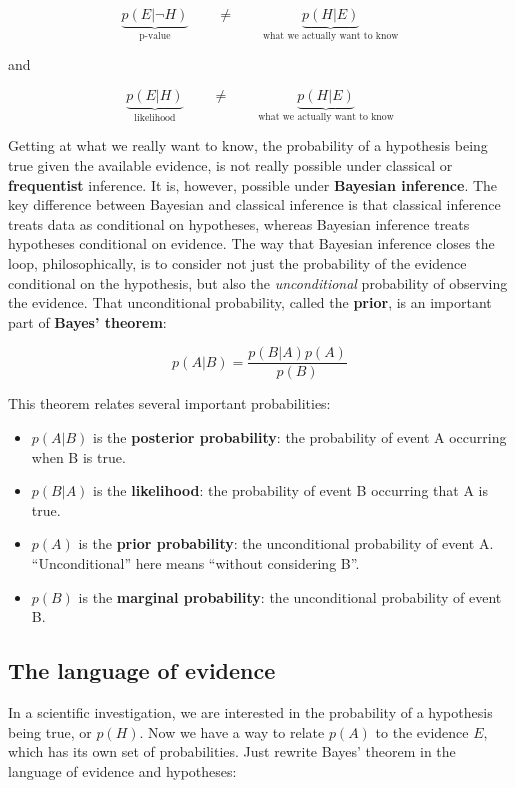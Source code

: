\documentclass[
  13,
  letterpaper,
]{report}
\providecommand{\tightlist}{%
  \setlength{\itemsep}{0pt}\setlength{\parskip}{0pt}}
\begin{document}
\[\underbrace{p\left(E|\lnot H\right)}_{\text{p-value}}\qquad\neq\qquad \underbrace{p\left(H|E\right)}_{\text{what we actually want to know}}\]

and

\[\underbrace{p\left(E|H\right)}_{\text{likelihood}}\qquad\neq\qquad \underbrace{p\left(H|E\right)}_{\text{what we actually want to know}}\]

Getting at what we really want to know, the probability of a hypothesis
being true given the available evidence, is not really possible under
classical or \textbf{frequentist} inference. It is, however, possible
under \textbf{Bayesian inference}. The key difference between Bayesian
and classical inference is that classical inference treats data as
conditional on hypotheses, whereas Bayesian inference treats hypotheses
conditional on evidence. The way that Bayesian inference closes the
loop, philosophically, is to consider not just the probability of the
evidence conditional on the hypothesis, but also the
\emph{unconditional} probability of observing the evidence. That
unconditional probability, called the \textbf{prior}, is an important
part of \textbf{Bayes' theorem}:

\[p\left(A|B\right)=\frac{p\left(B|A\right)p\left(A\right)}{p\left(B\right)}\]

This theorem relates several important probabilities:

\begin{itemize}
\tightlist
\item
  \(p\left(A|B\right)\) is the \textbf{posterior probability}: the
  probability of event A occurring when B is true.
\item
  \(p\left(B|A\right)\) is the \textbf{likelihood}: the probability of
  event B occurring that A is true.
\item
  \(p\left(A\right)\) is the \textbf{prior probability}: the
  unconditional probability of event A. ``Unconditional'' here means
  ``without considering B''.
\item
  \(p\left(B\right)\) is the \textbf{marginal probability}: the
  unconditional probability of event B.
\end{itemize}

\subsection{The language of evidence}\label{sec-intro-bayes-evidence}

In a scientific investigation, we are interested in the probability of a
hypothesis being true, or \(p\left(H\right)\). Now we have a way to
relate \(p\left(A\right)\) to the evidence \(E\), which has its own set
of probabilities. Just rewrite Bayes' theorem in the language of
evidence and hypotheses:
\end{document}

